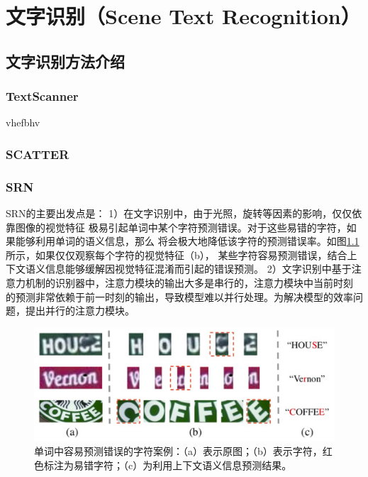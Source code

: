 \chapter{文字识别（Scene Text Recognition）}
\cite{scatter,2020srn,wan2019textscanner}
\section{文字识别方法介绍}
\subsection{TextScanner}
vhefbhv
\subsection{SCATTER}
\subsection{SRN}
SRN的主要出发点是：
1）在文字识别中，由于光照，旋转等因素的影响，仅仅依靠图像的视觉特征
极易引起单词中某个字符预测错误。对于这些易错的字符，如果能够利用单词的语义信息，那么
将会极大地降低该字符的预测错误率。如图\ref{srn_introduction}所示，如果仅仅观察每个字符的视觉特征（b），
某些字符容易预测错误，结合上下文语义信息能够缓解因视觉特征混淆而引起的错误预测。
2）文字识别中基于注意力机制的识别器中\cite{shi2018aster}，注意力模块的输出大多是串行的，注意力模块中当前时刻
的预测非常依赖于前一时刻的输出，导致模型难以并行处理。为解决模型的效率问题，提出并行的注意力模块。


\begin{figure}[H]
    \centering
    \includegraphics[width=.98\textwidth]{figure/recognition/srn_introduction.png} 
    \caption{单词中容易预测错误的字符案例：（a）表示原图；（b）表示字符，红色标注为易错字符；（c）为利用上下文语义信息预测结果。} 
    \label{srn_introduction} 
\end{figure}

